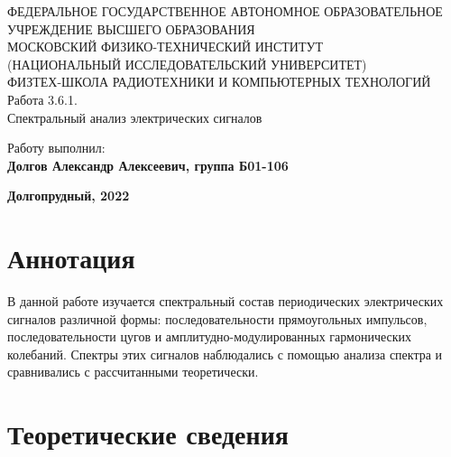 \documentclass[15pt,a5paper,reqno]{article}
\begin{document}
\begin{center}
  {\small ФЕДЕРАЛЬНОЕ ГОСУДАРСТВЕННОЕ АВТОНОМНОЕ ОБРАЗОВАТЕЛЬНОЕ\\ УЧРЕЖДЕНИЕ ВЫСШЕГО ОБРАЗОВАНИЯ\\ МОСКОВСКИЙ ФИЗИКО-ТЕХНИЧЕСКИЙ ИНСТИТУТ\\ (НАЦИОНАЛЬНЫЙ ИССЛЕДОВАТЕЛЬСКИЙ УНИВЕРСИТЕТ)\\ ФИЗТЕХ-ШКОЛА РАДИОТЕХНИКИ И КОМПЬЮТЕРНЫХ ТЕХНОЛОГИЙ}\\
  \hfill \break
  \hfill \break
  \hfill \break
  \Huge{Работа 3.6.1. \\ Спектральный анализ электрических сигналов}\\
\end{center}

\hfill \break
\hfill \break
\hfill \break
\hfill \break
\hfill \break
\hfill \break
\hfill \break
\hfill \break

\begin{flushright}
  \normalsize{Работу выполнил:}\\
  \normalsize{\textbf{Долгов Александр Алексеевич, группа Б01-106}}\\
\end{flushright}

\begin{center}
  \normalsize{\textbf{Долгопрудный, 2022}}
\end{center}

\thispagestyle{empty} %


\newpage
\thispagestyle{plain}
\tableofcontents
\thispagestyle{plain}
\newpage

\section{Аннотация}

    В данной работе изучается спектральный состав периодических электрических сигналов различной формы: последовательности прямоугольных импульсов, последовательности цугов и амплитудно-модулированных гармонических колебаний. Спектры этих сигналов наблюдались с помощью анализа спектра и сравнивались с рассчитанными теоретически.
	
\section{Теоретические сведения}
\end{document}
